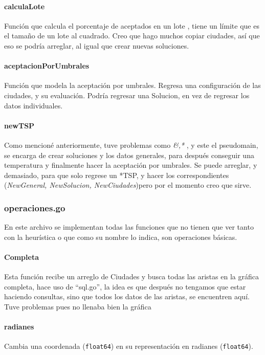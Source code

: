\documentclass[
10pt,
a4paper,
oneside,
headinclude,footinclude,
BCOR5mm,
]{article}
\begin{document}
\paragraph{calculaLote} Función que calcula el porcentaje de aceptados en un lote
, tiene un límite que es el tamaño de un lote al cuadrado. Creo que hago muchos
copiar ciudades, así que eso se podría arreglar, al igual que crear nuevas
soluciones.

\paragraph{aceptacionPorUmbrales} Función que modela la aceptación por umbrales.
Regresa una configuración de las ciudades, y su evaluación. Podría regresar una
Solucion, en vez de regresar los datos individuales.

\paragraph{newTSP} Como mencioné anteriormente, tuve problemas como \textit{\&,*}
, y este el pseudomain, se encarga de crear soluciones y los datos generales,
para después conseguir una temperatura y finalmente hacer la aceptación por
umbrales. Se puede arreglar, y demasiado, para que solo regrese un *TSP, y hacer
los correspondientes (\textit{NewGeneral, NewSolucion, NewCiudades})pero por el
momento creo que sirve.

\subsubsection{operaciones.go}
En este archivo se implementan todas las funciones que no tienen que ver tanto
con la heurística o que como su nombre lo indica, son operaciones básicas.

\paragraph{Completa} Esta función recibe un arreglo de Ciudades y busca todas las
aristas en la gráfica completa, hace uso de ``sql.go'', la idea es que después no
tengamos que estar haciendo consultas, sino que todos los datos de las aristas,
se encuentren aquí. Tuve problemas pues no llenaba bien la gráfica

\paragraph{radianes} Cambia una coordenada (\texttt{float64}) en su
representación en radianes (\texttt{float64}).
\end{document}
